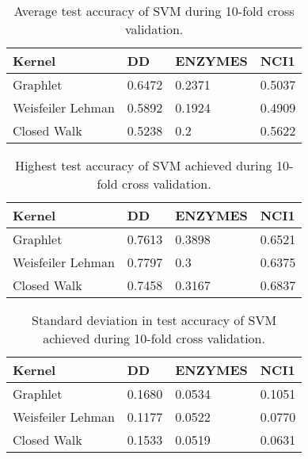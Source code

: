 \documentclass[12pt,a4paper,leqno]{article}
\begin{document}
			\begin{table}[h]
			\caption{Average test accuracy of SVM during 10-fold cross validation.}
			\centering
			\begin{tabular}{|l|l|l|l|}
				\hline
				Kernel & DD & ENZYMES  & NCI1  \\
				\hline
				\hline
				Graphlet & 0.6472 &   0.2371&  0.5037\\
				\hline
				Weisfeiler Lehman&  0.5892&  0.1924&  0.4909\\
				\hline
				Closed Walk &  0.5238&  0.2&   0.5622 \\
				\hline
			\end{tabular}
		\end{table}
		
		\begin{table}[h]
			\caption{Highest test accuracy of SVM achieved during 10-fold cross validation.}
			\centering
			\begin{tabular}{|l|l|l|l|}
				\hline
				Kernel & DD & ENZYMES  & NCI1  \\
				\hline
				\hline
				Graphlet &  0.7613&   0.3898&   0.6521\\
				\hline
				Weisfeiler Lehman&  0.7797&  0.3&  0.6375\\
				\hline
				Closed Walk &  0.7458&  0.3167&  0.6837 \\
				\hline
			\end{tabular}
		\end{table}
		
		\begin{table}[h]
			\caption{Standard deviation in test accuracy of SVM achieved during 10-fold cross validation.}
			\centering
			\begin{tabular}{|l|l|l|l|}
				\hline
				Kernel & DD & ENZYMES  & NCI1  \\
				\hline
				\hline
				Graphlet &  0.1680&   0.0534&  0.1051 \\
				\hline
				Weisfeiler Lehman&  0.1177&  0.0522& 0.0770 \\
				\hline
				Closed Walk &  0.1533&  0.0519 &   0.0631 \\
				\hline
			\end{tabular}
		\end{table}
\end{document}
